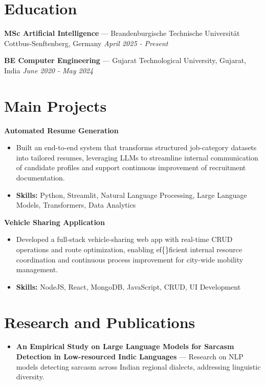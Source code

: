 \documentclass[a4paper,10pt]{article}
\begin{document}
\section*{Education}
\textbf{MSc Artificial Intelligence} — Brandenburgische Technische Universität Cottbus-Senftenberg, Germany \hfill \textit{April 2025 - Present}\par
\vspace{1.5pt}
\textbf{BE Computer Engineering} — Gujarat Technological University, Gujarat, India \hfill \textit{June 2020 - May 2024}\par

\section*{Main Projects}
\textbf{Automated Resume Generation}\par
\vspace{1pt}
\begin{itemize}
  \item Built an end-to-end system that transforms structured job-category datasets into tailored resumes, leveraging LLMs to streamline internal communication of candidate profiles and support continuous improvement of recruitment documentation.
  \item \textbf{Skills:} Python, Streamlit, Natural Language Processing, Large Language Models, Transformers, Data Analytics
\end{itemize}
\vspace{3pt}
\textbf{Vehicle Sharing Application}\par
\vspace{1pt}
\begin{itemize}
  \item Developed a full-stack vehicle-sharing web app with real-time CRUD operations and route optimization, enabling ef\{\}ficient internal resource coordination and continuous process improvement for city-wide mobility management.
  \item \textbf{Skills:} NodeJS, React, MongoDB, JavaScript, CRUD, UI Development
\end{itemize}

\section*{Research and Publications}
\begin{itemize}
\item \textbf{An Empirical Study on Large Language Models for Sarcasm Detection in Low-resourced Indic Languages} — Research on NLP models detecting sarcasm across Indian regional dialects, addressing linguistic diversity.
\end{itemize}
\end{document}
